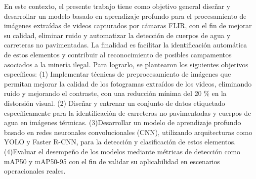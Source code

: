En este contexto, el presente trabajo tiene como objetivo general diseñar y desarrollar un modelo basado en aprendizaje profundo para el procesamiento de imágenes extraídas de videos capturados por cámaras FLIR, con el fin de mejorar su calidad, eliminar ruido y automatizar la detección de cuerpos de agua y carreteras no pavimentadas. La finalidad es facilitar la identificación automática de estos elementos y contribuir al reconocimiento de posibles campamentos asociados a la minería ilegal. Para lograrlo, se plantearon los siguientes objetivos específicos: (1) Implementar técnicas de preprocesamiento de imágenes que permitan mejorar la calidad de los fotogramas extraídos de los videos, eliminando ruido y mejorando el contraste, con una reducción mínima del 20 \% en la distorsión visual. (2) Diseñar y entrenar un conjunto de datos etiquetado específicamente para la identificación de carreteras no pavimentadas y cuerpos de agua en imágenes térmicas. (3)Desarrollar un modelo de aprendizaje profundo basado en redes neuronales convolucionales (CNN), utilizando arquitecturas como YOLO y Faster R-CNN, para la detección y clasificación de estos elementos. (4)Evaluar el desempeño de los modelos mediante métricas de detección como mAP\@50 y mAP\@50-95 con el fin de validar su aplicabilidad en escenarios operacionales reales.

